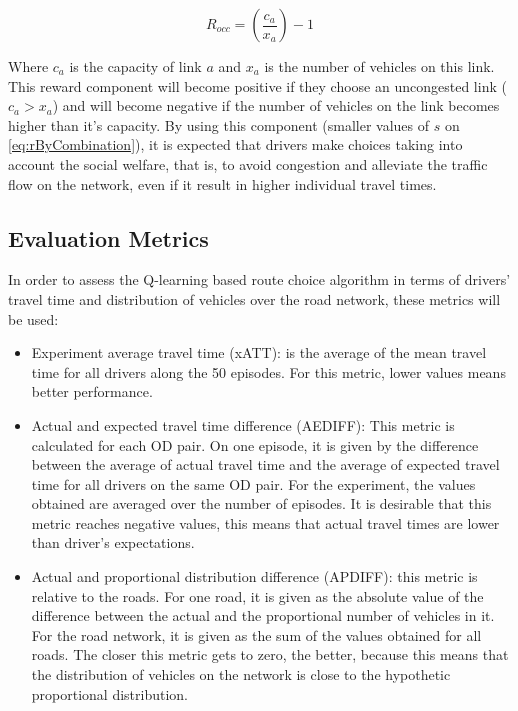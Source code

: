 \documentclass[12pt]{article}
\begin{document}
\begin{equation}
\label{eq:rByRoadOcc}
R_{occ} = \left(\frac{c_a}{x_a}\right) - 1
\end{equation}

Where $c_a$ is the capacity of link $a$ and $x_a$ is the number of vehicles on this link. This reward component will become positive if they choose an uncongested link ($c_a > x_a$) and will become negative if the number of vehicles on the link becomes higher than it's capacity. By using this component (smaller values of $s$ on \eqref{eq:rByCombination}), it is expected that drivers make choices taking into account the social welfare, that is, to avoid congestion and alleviate the traffic flow on the network, even if it result in higher individual travel times.

\subsection{Evaluation Metrics}
In order to assess the Q-learning based route choice algorithm in terms of drivers' travel time and distribution of vehicles over the road network, these metrics will be used:

\begin{itemize}
	\item Experiment average travel time (xATT): is the average of the mean travel time for all drivers along the 50 episodes. For this metric, lower values means better performance.
	\item Actual and expected travel time difference (AEDIFF): This metric is calculated for each OD pair. On one episode, it is given by the difference between the average of actual travel time and the average of expected travel time for all drivers on the same OD pair. For the experiment, the values obtained are averaged over the number of episodes. It is desirable that this metric reaches negative values, this means that actual travel times are lower than driver's expectations.
	\item Actual and proportional distribution difference (APDIFF): this metric is relative to the roads. For one road, it is given as the absolute value of the difference between the actual and the proportional number of vehicles in it. For the road network, it is given as the sum of the values obtained for all roads. The closer this metric gets to zero, the better, because this means that the distribution of vehicles on the network is close to the hypothetic proportional distribution.
\end{itemize}
\end{document}
